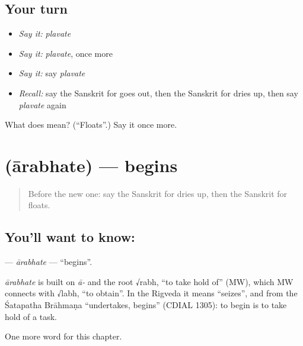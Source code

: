 \subsection*{Your turn}
\begin{itemize}
\raggedright
  \item \emph{Say it:} \emph{plavate}
  \item \emph{Say it:} \emph{plavate}, once more
  \item \emph{Say it:} say \emph{plavate}
  \item \emph{Recall:} say the Sanskrit for goes out, then the Sanskrit for dries up, then say \emph{plavate} again
\end{itemize}

\begin{tcolorbox}[breakable,colback=teal!4,colframe=teal!35!black,title={Before you move on}]
What does  mean? (\textquotedblleft{}Floats\textquotedblright{}.) Say it once more.
\end{tcolorbox}
\section[\texorpdfstring{\sk{आरभते} (ārabhate)}{आरभते (ārabhate)}]{ (ārabhate) — begins}

\label{lesson:SA-C234-arabhate}



\begin{quote}
Before the new one: say the Sanskrit for dries up, then the Sanskrit for floats.
\end{quote}

\subsection*{You'll want to know: }
\textbf{} — \emph{ārabhate} — \textquotedblleft{}begins\textquotedblright{}.

\begin{cousinweb}
\emph{ārabhate} is built on \emph{ā-} and the root √rabh, \textquotedblleft{}to take hold of\textquotedblright{} (MW), which MW connects with √labh, \textquotedblleft{}to obtain\textquotedblright{}. In the Rigveda it means \textquotedblleft{}seizes\textquotedblright{}, and from the Śatapatha Brāhmaṇa \textquotedblleft{}undertakes, begins\textquotedblright{} (CDIAL 1305): to begin is to take hold of a task.
\end{cousinweb}

\begin{grammarlens}[title={What you've built}]
One more word for this chapter.
\end{grammarlens}

